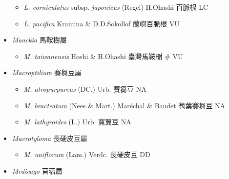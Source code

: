 \begin{itemize}
  \begin{itemize}
        \item[] \textit{L. corniculatus} subsp. \textit{japonicus} (Regel) H.Ohashi  百脈根   LC
        \item[] \textit{L. pacifica} Kramina \& D.D.Sokollof  蘭嶼百脈根   VU
  \end{itemize}
 \item[] \textit{Maackia} 馬鞍樹屬
                                
  \begin{itemize}
        \item[] \textit{M. taiwanensis} Hoshi \& H.Ohashi  臺灣馬鞍樹  \# VU
  \end{itemize}
 \item[] \textit{Macroptilium} 賽芻豆屬
                                
  \begin{itemize}
        \item[] \textit{M. atropurpureus} (DC.) Urb.  賽芻豆   NA
        \item[] \textit{M. bracteatum} (Nees \& Mart.) Maréchal \& Baudet  苞葉賽芻豆   NA
        \item[] \textit{M. lathyroides} (L.) Urb.  寬翼豆   NA
  \end{itemize}
 \item[] \textit{Macrotyloma} 長硬皮豆屬
                                
  \begin{itemize}
        \item[] \textit{M. uniflorum} (Lam.) Verdc.  長硬皮豆   DD
  \end{itemize}
 \item[] \textit{Medicago} 苜蓿屬
                                

\end{itemize}
